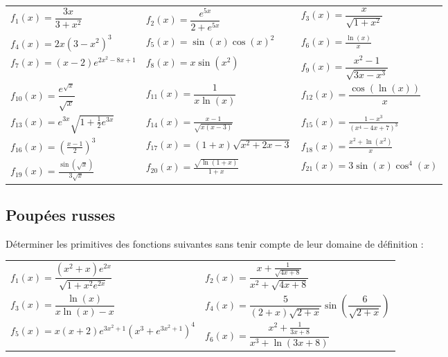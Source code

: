 \documentclass[oneside,12pt]{article}          %
\begin{document}
\renewcommand{\arraystretch}{2}
\begin{tabular}{ p{} p{} p{} }
    $f_1(x)=\dfrac{3x}{3+x^2}$ & $f_2(x)=\dfrac{e^{5x}}{2+e^{5x}}$ & $f_3(x)=\dfrac{x}{\sqrt{1+x^2}}$ \\
    
    $f_4(x)=2x\left(3-x^2\right)^3$ & $f_5(x)=\sin(x)\cos(x)^2$ & $f_6(x)=\frac{\ln(x)}{x}$ \\
    
    $f_7(x)=(x-2)e^{2x^2-8x+1}$ & $f_8(x)=x\sin(x^2)$ & $f_9(x)=\dfrac{x^2-1}{\sqrt{3x-x^3}}$ \\
    
    $f_{10}(x)=\dfrac{e^{\sqrt{x}}}{\sqrt{x}}$ & $f_{11}(x)=\dfrac{1}{x\ln(x)}$ & $f_{12}(x)=\dfrac{\cos(\ln(x))}{x}$ \\
    
    $f_{13}(x)=e^{3x}\sqrt{1+\frac{1}{2}e^{3x}}$ & $f_{14}(x)=\frac{x-1}{\sqrt{x(x-3)}}$ & $f_{15}(x)=\frac{1-x^3}{(x^4-4x+7)^3}$ \\
    
    $f_{16}(x)=\left(\frac{x-1}{2}\right)^3$ & $f_{17}(x)=(1+x)\sqrt{x^2+2x-3} $ & $f_{18}(x)= \frac{x^2+\ln(x^2)}{x}$ \\
    
    $f_{19}(x)= \frac{\sin\left(\sqrt{x}\right)}{3\sqrt{x}}$ & $f_{20}(x)= \frac{\sqrt{\ln(1+x)}}{1+x} $ & $f_{21}(x)=3\sin(x)\cos^4(x)$
\end{tabular}



\subsection{Poupées russes}
Déterminer les primitives des fonctions suivantes sans tenir compte de leur domaine de définition :

\renewcommand{\arraystretch}{2.4}
\begin{tabular}{ p{} p{} }
	$f_1(x)=\dfrac{(x^2+x)e^{2x}}{\sqrt{1+x^2e^{2x}}}$ & $f_2(x)=\dfrac{x+\frac{1}{\sqrt{4x+8}}}{x^2+\sqrt{4x+8}}$ \\
	$f_3(x)=\dfrac{\ln(x)}{x\ln(x)-x}$ & $f_4(x)=\dfrac{5}{(2+x)\sqrt{2+x}}\sin\left(\dfrac{6}{\sqrt{2+x}}\right)$ \\
	$f_5(x)=x(x+2)e^{3x^2+1}\left(x^3+e^{3x^2+1}\right)^4$ & $f_6(x)=\dfrac{x^2+\frac{1}{3x+8}}{x^3+\ln(3x+8)}$
\end{tabular}
\end{document}
